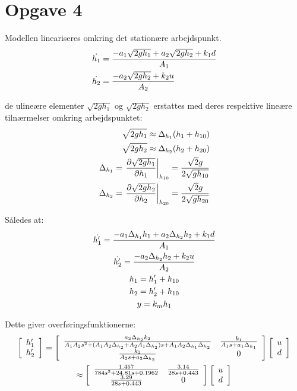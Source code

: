 \section{Opgave 4}
Modellen lineariseres omkring det stationære arbejdspunkt.
\begin{align*}
\dot{h_1} &= \frac{-a_1\sqrt{2gh_1} + a_2\sqrt{2gh_2} + k_1d}{A_1}\\
\dot{h_2} &= \frac{-a_2\sqrt{2gh_2} + k_2u}{A_2}\\
\end{align*}

de ulineære elementer $\sqrt{2gh_1}$ og $\sqrt{2gh_2}$ erstattes med deres
respektive lineære tilnærmelser omkring arbejdspunktet:
\begin{align*}
\sqrt{2gh_1} \approx \Delta_{h_1}(h_1 + h_{10})\\
\sqrt{2gh_2} \approx \Delta_{h_2}(h_2 + h_{20})\\
\Delta_{h_1} = \left.\frac{\partial {\sqrt{2gh_1}}}{\partial {h_1}}\right|_{h_{10}}
 = \frac{\sqrt{2}g}{2\sqrt{gh_{10}}}\\
\Delta_{h_2} = \left.\frac{\partial {\sqrt{2gh_2}}}{\partial {h_2}}\right|_{h_{20}}
 = \frac{\sqrt{2}g}{2\sqrt{gh_{20}}}
\end{align*}

Således at:
\begin{gather*}
\dot{h'_1} = \frac{-a_1\Delta_{h_1}h_1 + a_2\Delta_{h_2}h_2
+ k_1d}{A_1}\\
\dot{h'_2} = \frac{-a_2\Delta_{h_2}h_2 + k_2u}{A_2}\\
h_1 = h'_1 + h_{10}\\
h_2 = h'_2 + h_{10}\\
y = k_m h_1
\end{gather*}

Dette giver overføringsfunktionerne:
\begin{gather*}
\matrix{c}{}{}{ h'_1 \\ h'_2 } =
\matrix{c c}{}{}{
\frac{ a_2 \Delta_{h_2} k_2 }
	{ A_1A_2s^2
	+ ( A_1 A_2 \Delta_{h_2} + A_2 A_1 \Delta_{h_2} ) s
	+ A_1 A_2 \Delta_{h_1} \Delta_{h_2} } &
\frac{k_1}{ A_1 s + a_1 \Delta_{h_1} } \\
\frac{k_2}{ A_2 s + a_2 \Delta_{h_2} } &
0
}
\matrix{c}{}{}{ u \\ d }\\
\approx \matrix{c c}{}{}{
 \frac{1.457}{784 s^2 + 24.81 s + 0.1962} &
 \frac{3.14}{28s + 0.443} \\
\frac{3.29}{28s + 0.443} &
0 
}
\matrix{c}{}{}{ u \\ d }
\end{gather*}

